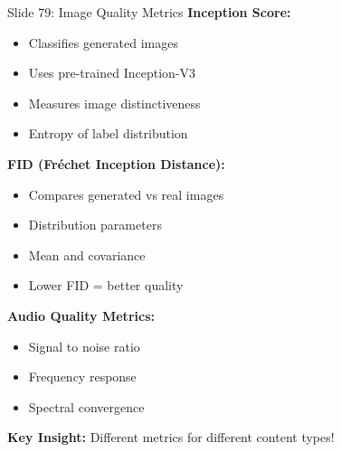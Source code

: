 \documentclass[8pt]{beamer}
\begin{document}
	\begin{frame}{Slide 79: Image Quality Metrics}
		\fontsize{6.5}{7.5}\selectfont
		\textbf{Inception Score:}
		\begin{itemize}
			\item Classifies generated images
			\item Uses pre-trained Inception-V3
			\item Measures image distinctiveness
			\item Entropy of label distribution
		\end{itemize}
		
		\vspace{0.1cm}
		\textbf{FID (Fréchet Inception Distance):}
		\begin{itemize}
			\item Compares generated vs real images
			\item Distribution parameters
			\item Mean and covariance
			\item Lower FID = better quality
		\end{itemize}
		
		\vspace{0.1cm}
		\textbf{Audio Quality Metrics:}
		\begin{itemize}
			\item Signal to noise ratio
			\item Frequency response
			\item Spectral convergence
		\end{itemize}
		
		\textcolor{myblue}{\textbf{Key Insight:}} Different metrics for different content types!
	\end{frame}
	
\end{document}

